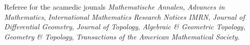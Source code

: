 
Referee for the acamedic jounals \textit{Mathematische Annalen}, \textit{Advances in Mathematics}, \textit{International Mathematics Research Notices IMRN}, \textit{Journal of Differential Geometry}, \textit{Journal of Topology}, \textit{Algebraic \& Geometric Topology}, \textit{Geometry \& Topology}, \textit{Transactions of the American Mathematical Society}.
%

